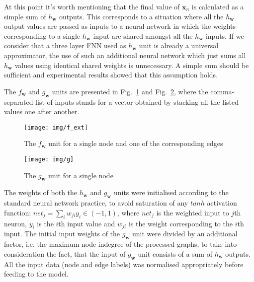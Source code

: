 At this point it's worth mentioning that the final value of $\bm{x}_n$ is calculated as a simple sum of $h_{\bm{w}}$ outputs. This corresponds to a situation where all the $h_{\bm{w}}$ output values are passed as inputs to a neural network in which the weights corresponding to a single $h_{\bm{w}}$ input are shared amongst all the $h_{\bm{w}}$ inputs. If we consider that a three layer FNN used as $h_{\bm{w}}$ unit is already a universal approximator, the use of such an additional neural network which just sums all $h_{\bm{w}}$ values using identical shared weights is unnecessary. A simple sum should be sufficient and experimental results showed that this assumption holds.

The $f_{\bm{w}}$ and $g_{\bm{w}}$ units are presented in Fig.~\ref{fig:gnn_f} and Fig.~\ref{fig:gnn_g}, where the comma-separated list of inputs stands for a vector obtained by stacking all the listed values one after another.

\begin{figure}[h!]
\begin{center}
	\texttt{[image: img/f\_ext]}
	\caption{The $f_{\bm{w}}$ unit for a single node and one of the corresponding edges}
	\label{fig:gnn_f}
\end{center}
\end{figure}

\begin{figure}[h!]
\begin{center}
	\texttt{[image: img/g]}
	\caption{The $g_{\bm{w}}$ unit for a single node}
	\label{fig:gnn_g}
\end{center}
\end{figure}

\newpage
The weights of both the $h_{\bm{w}}$ and $g_{\bm{w}}$ units were initialised according to the standard neural network practice, to avoid saturation of any $tanh$ activation function: $net_j = \sum_i w_{ji} y_i \in (-1, 1)$, where $net_j$ is the weighted input to $j$th neuron, $y_i$ is the $i$th input value and $w_{ji}$ is the weight corresponding to the $i$th input. The initial input weights of the $g_{\bm{w}}$ unit were divided by an additional factor, i.e. the maximum node indegree of the processed graphs, to take into consideration the fact, that the input of $g_{\bm{w}}$ unit consists of a sum of $h_{\bm{w}}$ outputs. All the input data (node and edge labels) was normalised appropriately before feeding to the model.



